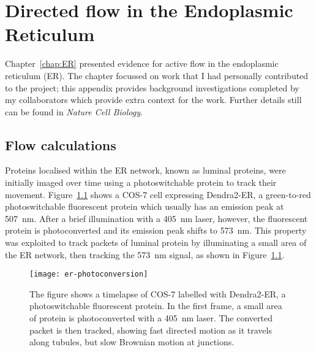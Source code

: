
\ifpdf
    \graphicspath{{Appendix2/Figs/Raster/}{Appendix2/Figs/PDF/}{Appendix2/Figs/}}
\else
    \graphicspath{{Appendix2/Figs/Vector/}{Appendix2/Figs/}}
\fi

\chapter{Directed flow in the Endoplasmic Reticulum} \label{appx:er}
Chapter~\ref{chap:ER} presented evidence for active flow in the endoplasmic reticulum (ER). 
The chapter focussed on work that I had personally contributed to the project; this appendix provides background investigations completed by my collaborators which provide extra context for the work. 
Further details still can be found in \textit{Nature Cell Biology}. 

\section{Flow calculations} \label{appn:flow}
Proteins localised within the ER network, known as luminal proteins, were initially imaged over time using a photoswitchable protein to track their movement. 
Figure~\ref{fig:er-photoconversion} shows a COS-7 cell expressing Dendra2-ER, a green-to-red photoswitchable fluorescent protein which usually has an emission peak at \SI{507}{\nano\metre}. 
After a brief illumination with a \SI{405}{\nano\metre} laser, however, the fluorescent protein is photoconverted and its emission peak shifts to \SI{573}{\nano\metre}. 
This property was exploited to track packets of luminal protein by illuminating a small area of the ER network, then tracking the \SI{573}{\nano\metre} signal, as shown in Figure~\ref{fig:er-photoconversion}. 

\begin{figure}[tbp]
\centering
\texttt{[image: er-photoconversion]}
\caption[Photoconversion allows luminal ER proteins to be tracked]{The figure shows a timelapse of COS-7 labelled with Dendra2-ER, a photoswitchable fluorescent protein. In the first frame, a small area of protein is photoconverted with a \SI{405}{\nano\metre} laser. The converted packet is then tracked, showing fast directed motion as it travels along tubules, but slow Brownian motion at junctions. } 
\label{fig:er-photoconversion}
\end{figure}

